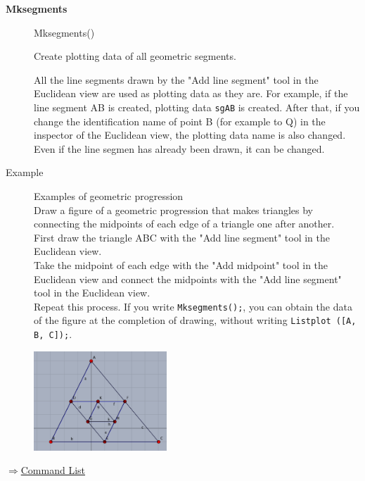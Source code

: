 \documentclass[papersize,a4paper,12pt]{article}
\newenvironment{cmd}[2]{
\hypertarget{#2}{}
\begin{center}{\bf\large #1}\end{center}
\begin{description}
}{
\end{description}
\begin{flushright} \hyperlink{functionlist}{$\Rightarrow$Command List}\end{flushright}
}
\newcommand{\itemket}[1]{
\item[\Ltab{27mm}{#1}]
}
\begin{document}
\begin{cmd}{Mksegments}{mksegments}
\itemket{Usage}Mksegments()
\itemket{Description}Create plotting data of all geometric segments. 
\itemket{Details}
All the line segments drawn by the "Add line segment" tool in the Euclidean view are used as plotting data as they are. 
For example, if the line segment AB is created, plotting data \verb|sgAB| is created. 
After that, if you change the identification name of point B (for example to Q) in the inspector of the Euclidean view, the plotting data name is also changed. 
Even if the line segmen has already been drawn, it can be changed. \\

\item[Example]\mbox{}
Examples of geometric progression\\
Draw a figure of a geometric progression that makes triangles by connecting the midpoints of each edge of a triangle one after another. \\
First draw the triangle ABC with the "Add line segment" tool in the Euclidean view. \\
Take the midpoint of each edge with the "Add midpoint" tool in the Euclidean view and connect the midpoints with the "Add line segment" tool in the Euclidean view. \\
Repeat this process. 
If you write \verb|Mksegments();|, you can obtain the data of the figure at the completion of drawing, without writing \verb|Listplot ([A, B, C]);|. \\
\begin{center}
\includegraphics[bb=0.00 0.00 438.00 327.00,width=5cm]{Fig/gpro01.pdf}\hspace{10mm}
\end{center}
\end{cmd}

\end{document}
